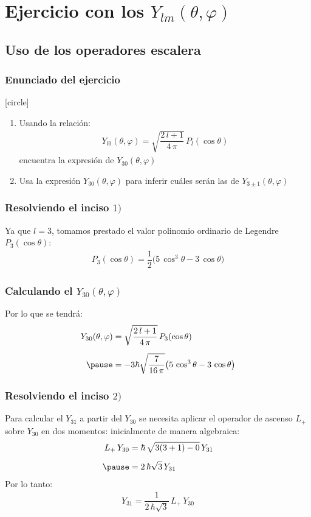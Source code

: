 \documentclass[12pt]{beamer}
\begin{document}
\section{Ejercicio con los \texorpdfstring{$Y_{lm}(\theta, \varphi)$}{Ylm (t,f)}}
\subsection{Uso de los operadores escalera}

\begin{frame}
\frametitle{Enunciado del ejercicio}
[circle]
\begin{enumerate}[<+->]
\item Usando la relación:
\begin{align*}
Y_{l0}(\theta, \varphi) = \sqrt{\dfrac{2 \, l + 1}{4 \, \pi}} \, P_{l} (\cos \theta)
\end{align*}
encuentra la expresión de $Y_{30}(\theta, \varphi)$
\item Usa la expresión $Y_{30}(\theta, \varphi)$ para inferir cuáles serán las de $Y_{3 \pm 1}(\theta, \varphi)$
\end{enumerate}
\end{frame}
\begin{frame}
\frametitle{Resolviendo el inciso $1)$}
Ya que $l = 3$, tomamos prestado el valor polinomio ordinario de Legendre $P_{3}(\cos \theta)$:
\pause
\begin{align*}
P_{3}(\cos \theta) = \dfrac{1}{2} \big( 5 \, \cos^{3} \theta - 3 \, \cos \theta \big)
\end{align*}
\end{frame}
\begin{frame}
\frametitle{Calculando el $Y_{3 0}(\theta, \varphi)$}
Por lo que se tendrá:
\begin{eqnarray*}
\begin{aligned}
Y_{3 0}(\theta, \varphi) &= \sqrt{\dfrac{2 \, l + 1}{4 \, \pi}} \, P_{3}(\cos \theta) \\[0.5em] \pause
&= - 3 \hbar \sqrt{\dfrac{7}{16 \, \pi}} \big( 5 \, \cos^{3} \theta - 3 \, \cos \theta \big)
\end{aligned}
\end{eqnarray*}
\end{frame}
\begin{frame}
\frametitle{Resolviendo el inciso $2)$}
Para calcular el $Y_{31}$ a partir del $Y_{30}$ \pause se necesita aplicar el operador de ascenso $L_{+}$ sobre $Y_{30}$ en dos momentos: \pause inicialmente de manera algebraica:
\pause
\begin{eqnarray*}
\begin{aligned}
L_{+} \, Y_{30} &= \hbar \, \sqrt{3 (3 + 1)- 0} \, Y_{31} \\[0.5em] \pause
&= 2 \, \hbar \sqrt{3} \, Y_{31}
\end{aligned}
\end{eqnarray*}
\pause
Por lo tanto:
\pause
\begin{align*}
Y_{31} = \dfrac{1}{2 \, \hbar \sqrt{3}} \, L_{+} \, Y_{30}
\end{align*}
\end{frame}
\end{document}
